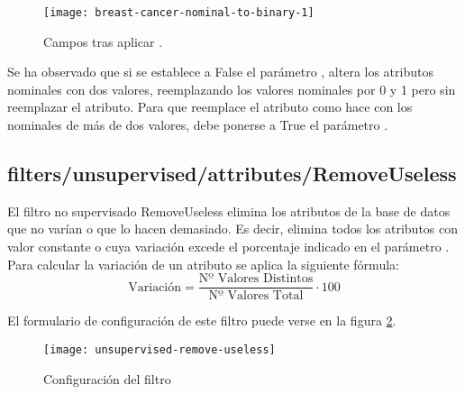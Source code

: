 \begin{figure}[ht]
    \centering
    \texttt{[image: breast-cancer-nominal-to-binary-1]}
    \caption{Campos tras aplicar .}
    \label{fig:breast-cancer-nominal-to-binary-1}
\end{figure}

Se ha observado que si se establece a False el parámetro \code{}, altera los atributos nominales con dos valores, reemplazando los valores nominales por 0 y 1 pero sin reemplazar el atributo. Para que reemplace el atributo como hace con los nominales de más de dos valores, debe ponerse a True el parámetro .

\subsection{filters/unsupervised/attributes/RemoveUseless}
El filtro no supervisado RemoveUseless elimina los atributos de la base de datos que no varían o que lo hacen demasiado. Es decir, elimina todos los atributos con valor constante o cuya variación excede el porcentaje indicado en el parámetro . Para calcular la variación de un atributo se aplica la siguiente fórmula:
\begin{equation*}
\text{Variación}=\dfrac{\text{Nº Valores Distintos}}{\text{Nº Valores Total}}\cdot100
\end{equation*}

El formulario de configuración de este filtro puede verse en la figura \ref{fig:unsupervised-remove-useless}.

\begin{figure}[ht]
    \centering
    \texttt{[image: unsupervised-remove-useless]}
    \caption{Configuración del filtro }
    \label{fig:unsupervised-remove-useless}
\end{figure}

